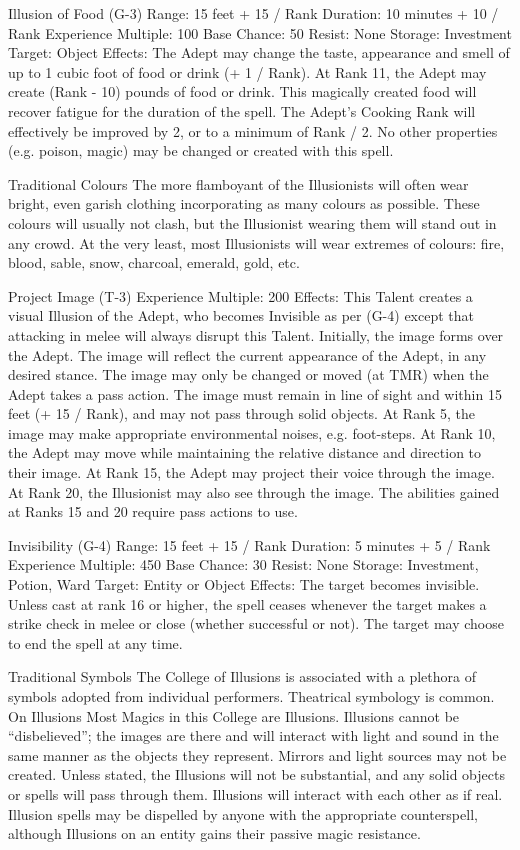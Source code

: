 \documentclass[a4paper]{article}
\begin{document}
\begin{multicols}{3}
Illusion of Food (G-3)
Range: 15 feet + 15 / Rank
Duration: 10 minutes + 10 / Rank
Experience Multiple: 100
Base Chance: 50%
Resist: None
Storage: Investment
Target: Object
Effects: The Adept may change the taste, appearance and smell of up to 1 cubic foot of food or
drink (+ 1 / Rank). At Rank 11, the Adept may
create (Rank - 10) pounds of food or drink. This
magically created food will recover fatigue for the
duration of the spell. The Adept’s Cooking Rank
will effectively be improved by 2, or to a minimum
of Rank / 2. No other properties (e.g. poison,
magic) may be changed or created with this spell.

Traditional Colours
The more flamboyant of the Illusionists will often
wear bright, even garish clothing incorporating as
many colours as possible. These colours will usually not clash, but the Illusionist wearing them will
stand out in any crowd. At the very least, most
Illusionists will wear extremes of colours: fire,
blood, sable, snow, charcoal, emerald, gold, etc.

Project Image (T-3)
Experience Multiple: 200
Effects: This Talent creates a visual Illusion of the
Adept, who becomes Invisible as per (G-4) except
that attacking in melee will always disrupt this
Talent. Initially, the image forms over the Adept.
The image will reflect the current appearance of
the Adept, in any desired stance. The image may
only be changed or moved (at TMR) when the
Adept takes a pass action. The image must remain
in line of sight and within 15 feet (+ 15 / Rank),
and may not pass through solid objects. At Rank 5,
the image may make appropriate environmental
noises, e.g. foot-steps. At Rank 10, the Adept may
move while maintaining the relative distance and
direction to their image. At Rank 15, the Adept
may project their voice through the image. At Rank
20, the Illusionist may also see through the image.
The abilities gained at Ranks 15 and 20 require
pass actions to use.

Invisibility (G-4)
Range: 15 feet + 15 / Rank
Duration: 5 minutes + 5 / Rank
Experience Multiple: 450
Base Chance: 30%
Resist: None
Storage: Investment, Potion, Ward
Target: Entity or Object
Effects: The target becomes invisible. Unless cast
at rank 16 or higher, the spell ceases whenever the
target makes a strike check in melee or close
(whether successful or not). The target may choose
to end the spell at any time.

Traditional Symbols
The College of Illusions is associated with a plethora of symbols adopted from individual performers. Theatrical symbology is common.
On Illusions
Most Magics in this College are Illusions. Illusions
cannot be “disbelieved”; the images are there and
will interact with light and sound in the same manner as the objects they represent. Mirrors and light
sources may not be created. Unless stated, the
Illusions will not be substantial, and any solid
objects or spells will pass through them. Illusions
will interact with each other as if real. Illusion
spells may be dispelled by anyone with the appropriate counterspell, although Illusions on an entity
gains their passive magic resistance.


\end{multicols}
\end{document}
